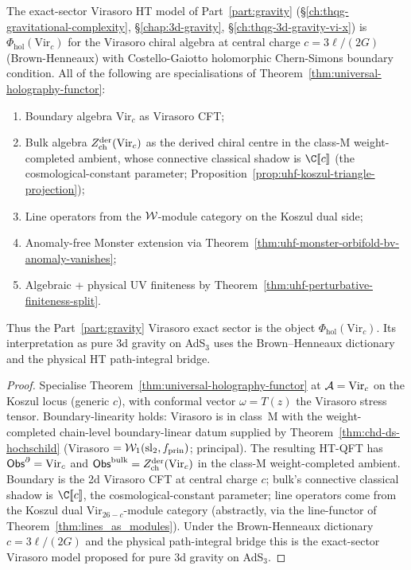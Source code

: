 \begin{corollary}
\label{cor:uhf-universal-holography-is-a-theorem}
The exact-sector Virasoro HT model of Part~\ref*{part:gravity}
\textup{(}\S\ref*{ch:thqg-gravitational-complexity},
\S\ref*{chap:3d-gravity},
\S\ref*{ch:thqg-3d-gravity-vi-x}\textup{)} is
$\Phi_{\mathrm{hol}}(\mathrm{Vir}_c)$ for the Virasoro chiral
algebra at central charge $c = 3\ell / (2G)$
\textup{(}Brown-Henneaux\textup{)} with Costello-Gaiotto
holomorphic Chern-Simons boundary condition. All of the following
are specialisations of Theorem~\ref{thm:universal-holography-functor}:
\begin{enumerate}[label=\textup{(\roman*)}]
\item Boundary algebra $\mathrm{Vir}_c$ as Virasoro CFT;
\item Bulk algebra $Z^{\mathrm{der}}_{\mathrm{ch}}(\mathrm{Vir}_c)$ as the derived chiral
 centre in the class-M weight-completed ambient, whose connective
 classical shadow is
 $\C[\![c]\!]$ \textup{(}the cosmological-constant parameter;
 Proposition~\ref{prop:uhf-koszul-triangle-projection}\textup{)};
\item Line operators from the $\mathcal{W}$-module category on the Koszul
 dual side;
\item Anomaly-free Monster extension via
 Theorem~\ref{thm:uhf-monster-orbifold-bv-anomaly-vanishes};
\item Algebraic + physical UV finiteness by
 Theorem~\ref{thm:uhf-perturbative-finiteness-split}.
\end{enumerate}
Thus the Part~\ref*{part:gravity} Virasoro exact sector is the object
$\Phi_{\mathrm{hol}}(\mathrm{Vir}_c)$. Its interpretation as pure
3d gravity on AdS$_3$ uses the Brown--Henneaux dictionary and the
physical HT path-integral bridge.
\end{corollary}

\begin{proof}
Specialise Theorem~\ref{thm:universal-holography-functor} at
$\mathcal{A} = \mathrm{Vir}_c$ on the Koszul locus (generic $c$), with
conformal vector $\omega = T(z)$ the Virasoro stress tensor.
Boundary-linearity holds: Virasoro is in class~M with the
weight-completed chain-level boundary-linear datum supplied by
Theorem~\ref*{thm:chd-ds-hochschild} (Virasoro $=\mathcal{W}_1(\mathrm{sl}_2, f_{\mathrm{prin}})$;
principal). The resulting HT-QFT has
$\mathsf{Obs}^\partial = \mathrm{Vir}_c$
and
$\mathsf{Obs}^{\mathrm{bulk}} = Z^{\mathrm{der}}_{\mathrm{ch}}(\mathrm{Vir}_c)$
in the class-M weight-completed ambient. Boundary is the 2d Virasoro CFT at central charge
$c$; bulk's connective classical shadow is $\C[\![c]\!]$, the
cosmological-constant parameter; line operators come from the
Koszul dual $\mathrm{Vir}_{26-c}$-module category (abstractly, via
the line-functor of Theorem~\ref*{thm:lines_as_modules}). Under
the Brown-Henneaux dictionary $c = 3\ell / (2G)$ and the physical
path-integral bridge this is the exact-sector Virasoro model proposed
for pure 3d gravity on AdS$_3$.
\end{proof}

